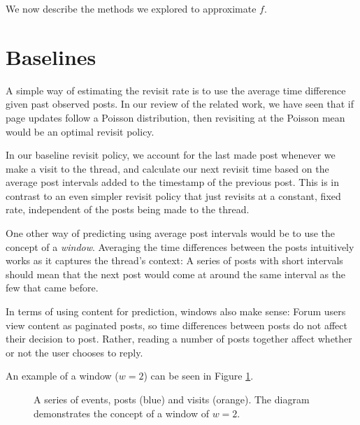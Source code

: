 We now describe the methods we explored to approximate $f$.

\section{Baselines}
A simple way of estimating the revisit rate is to use the average time 
difference given past observed posts. In our review of the related work, we 
have seen that if page updates follow a Poisson distribution, then revisiting at 
the Poisson mean would be an optimal revisit policy. %

In our baseline revisit policy, we account for the last made post whenever 
we make a visit to the thread, and calculate our next revisit time based on the 
average post intervals added to the timestamp of the previous post. This is in 
contrast to an even simpler revisit policy that just revisits at a constant, 
fixed rate, independent of the posts being made to the thread.

One other way of predicting using average post intervals would be to use the 
concept of a \emph{window}. Averaging the time differences between the posts 
intuitively works as it captures the thread's context: A 
series of posts with short intervals should mean that the next post would come 
at around the same interval as the few that came before.

In terms of using content for prediction, windows also make sense: Forum users 
view content as paginated posts, so time differences between posts do not affect 
their decision to post. 
Rather, reading a number of posts together affect 
whether or not the user chooses to reply.

An example of a window ($w=2$) can be seen in Figure \ref{fig:event_series}.

\begin{figure}
	\begin{center}
	
	\caption{%
A series of events, posts (blue) and visits (orange).  The diagram demonstrates 
the concept of a window of $w=2$.
}\label{fig:event_series}
	\end{center}
\end{figure}


